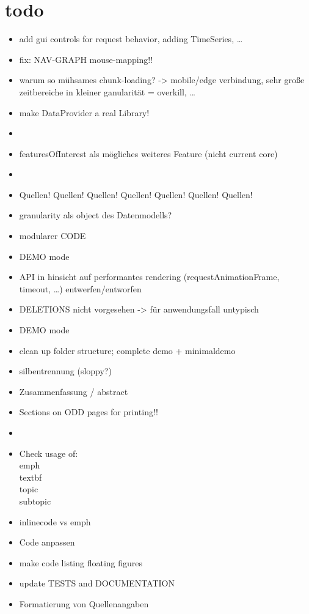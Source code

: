 
\section*{todo}
\begin{itemize}
    \item add gui controls for request behavior, adding TimeSeries, \ldots
    \item fix: NAV-GRAPH mouse-mapping!!
    \item warum so mühsames chunk-loading? -> mobile/edge verbindung, sehr große zeitbereiche in kleiner ganularität = overkill, \ldots
    \item make DataProvider a real Library!
    \item {}
    \item featuresOfInterest als mögliches weiteres Feature (nicht current core)
    \item {}
    \item Quellen!  Quellen!  Quellen!  Quellen!  Quellen!  Quellen!  Quellen!
    \item granularity als object des Datenmodells?
    \item modularer CODE
    \item DEMO mode
    \item API in hinsicht auf performantes rendering (requestAnimationFrame, timeout, \ldots) entwerfen/entworfen
    \item DELETIONS nicht vorgesehen -> für anwendungsfall untypisch
    \item DEMO mode
    \item clean up folder structure; complete demo + minimaldemo
    \item silbentrennung (sloppy?)
\end{itemize}
\begin{itemize}
    \item Zusammenfassung / abstract
    \item Sections on ODD pages for printing!!
    \item {}
    \item Check usage of: \\emph \\textbf \\topic \\subtopic
    \item inlinecode vs emph
    \item Code anpassen
    \item make code listing floating figures
    \item update TESTS and DOCUMENTATION
    \item Formatierung von Quellenangaben
\end{itemize}
